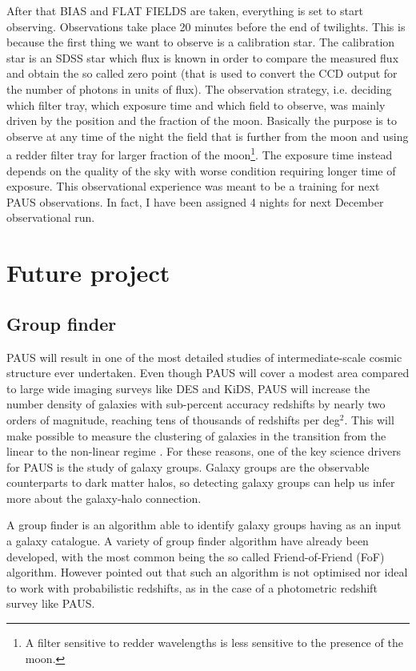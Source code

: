 \documentclass[11pt]{article}
\begin{document}
After that BIAS and FLAT FIELDS are taken, everything is set to start observing. Observations take place 20 minutes before the end of twilights. This is because the first thing we want to observe is a calibration star. The calibration star is an SDSS star which flux is known in order to compare the measured flux and obtain the so called zero point (that is used to convert the CCD output for the number of photons in units of flux). 
The observation strategy, i.e. deciding which filter tray, which exposure time and which field to observe, was mainly driven by the position and the fraction of the moon. Basically the purpose is to observe at any time of the night the field that is further from the moon and using a redder filter tray for larger fraction of the moon\footnote{A filter sensitive to redder wavelengths is less sensitive to the presence of the moon.}. The exposure time instead depends on the quality of the sky with worse condition requiring longer time of exposure.
This observational experience was meant to be a training for next PAUS observations. 
In fact, I have been assigned 4 nights for next December observational run.  

\section{Future project}
\label{sec:future}
\subsection{Group finder}
\label{sub:group}
PAUS will result in one of the most detailed studies of intermediate-scale cosmic structure ever undertaken. Even though PAUS will cover a modest area compared to large wide imaging surveys like DES and KiDS, PAUS will increase the number density of galaxies with sub-percent accuracy redshifts by nearly two orders of magnitude, reaching tens of thousands of redshifts per deg$^2$. This will make possible to measure the clustering of galaxies in the transition from the linear to the non-linear regime \citep{stothert18}. For these reasons, one of the key science drivers for PAUS is the study of galaxy groups. 
Galaxy groups are the observable counterparts to dark matter halos, so detecting galaxy groups can help us infer more about the galaxy-halo connection.

A group finder is an algorithm able to identify galaxy groups having as an input a galaxy catalogue. A variety of group finder algorithm have already been developed, with the most common being the so called Friend-of-Friend (FoF) algorithm. However \cite{stothert18_thesis} pointed out that such an algorithm is not optimised nor ideal to work with probabilistic redshifts, as in the case of a photometric redshift survey like PAUS.
\end{document}
